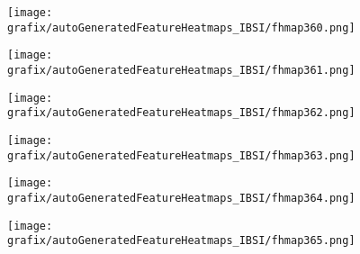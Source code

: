 \hspace{\hsp} 
\begin{subfigure}{\wid\textwidth} 
    \centering 
    \caption{\tiny \sffamily {}} 
    \vspace{\vsp} 
    \texttt{[image: grafix/autoGeneratedFeatureHeatmaps\_IBSI/fhmap360.png]} 
\end{subfigure} 
\hspace{\hsp} 
\begin{subfigure}{\wid\textwidth} 
    \centering 
    \caption{\tiny \sffamily {}} 
    \vspace{\vsp} 
    \texttt{[image: grafix/autoGeneratedFeatureHeatmaps\_IBSI/fhmap361.png]} 
\end{subfigure} 
\hspace{\hsp} 
\begin{subfigure}{\wid\textwidth} 
    \centering 
    \caption{\tiny \sffamily {}} 
    \vspace{\vsp} 
    \texttt{[image: grafix/autoGeneratedFeatureHeatmaps\_IBSI/fhmap362.png]} 
\end{subfigure} 
\hspace{\hsp} 
\begin{subfigure}{\wid\textwidth} 
    \centering 
    \caption{\tiny \sffamily {}} 
    \vspace{\vsp} 
    \texttt{[image: grafix/autoGeneratedFeatureHeatmaps\_IBSI/fhmap363.png]} 
\end{subfigure} 
\hspace{\hsp} 
\begin{subfigure}{\wid\textwidth} 
    \centering 
    \caption{\tiny \sffamily {}} 
    \vspace{\vsp} 
    \texttt{[image: grafix/autoGeneratedFeatureHeatmaps\_IBSI/fhmap364.png]} 
\end{subfigure} 
\hspace{\hsp} 
\begin{subfigure}{\wid\textwidth} 
    \centering 
    \caption{\tiny \sffamily {}} 
    \vspace{\vsp} 
    \texttt{[image: grafix/autoGeneratedFeatureHeatmaps\_IBSI/fhmap365.png]} 
\end{subfigure} 
\hspace{\hsp} 
